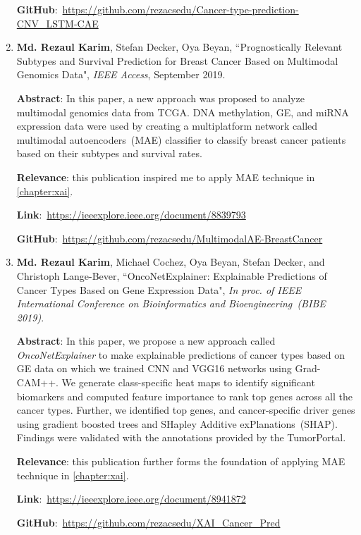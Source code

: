 \begin{enumerate}
	\textbf{GitHub}:~\url{https://github.com/rezacsedu/Cancer-type-prediction-CNV_LSTM-CAE} 
	
	\item \textbf{Md. Rezaul Karim}, Stefan Decker, Oya Beyan, ``Prognostically Relevant Subtypes and Survival Prediction for Breast Cancer Based on Multimodal Genomics Data", \emph{IEEE Access}, September 2019.
	
	\textbf{Abstract}: In this paper, a new approach was proposed to analyze multimodal genomics data from TCGA. DNA methylation, GE, and miRNA expression data were used by creating a multiplatform network called multimodal autoencoders~(MAE) classifier to classify breast cancer patients based on their subtypes and survival rates.
	
	\textbf{Relevance}: this publication inspired me to apply MAE technique in \cref{chapter:xai}.
	
	\textbf{Link}:~\url{https://ieeexplore.ieee.org/document/8839793}
	
	\textbf{GitHub}:~\url{https://github.com/rezacsedu/MultimodalAE-BreastCancer}
	
	\item \textbf{Md. Rezaul Karim}, Michael Cochez, Oya Beyan, Stefan Decker, and Christoph Lange-Bever, ``OncoNetExplainer: Explainable Predictions of Cancer Types Based on Gene Expression Data", \emph{In proc. of IEEE International Conference on Bioinformatics and Bioengineering~(BIBE 2019)}.
	
	\textbf{Abstract}: In this paper, we propose a new approach called \emph{OncoNetExplainer} to make explainable predictions of cancer types based on GE data on which we trained CNN and VGG16 networks using Grad-CAM++. We generate class-specific heat maps to identify significant biomarkers and computed feature importance to rank top genes across all the cancer types. Further, we identified top genes, and cancer-specific driver genes using gradient boosted trees and SHapley Additive exPlanations~(SHAP). Findings were validated with the annotations provided by the TumorPortal. 
	
	\textbf{Relevance}: this publication further forms the foundation of applying MAE technique in \cref{chapter:xai}.
	
	\textbf{Link}:~\url{https://ieeexplore.ieee.org/document/8941872}

	\textbf{GitHub}:~\url{https://github.com/rezacsedu/XAI_Cancer_Pred}
\end{enumerate}


